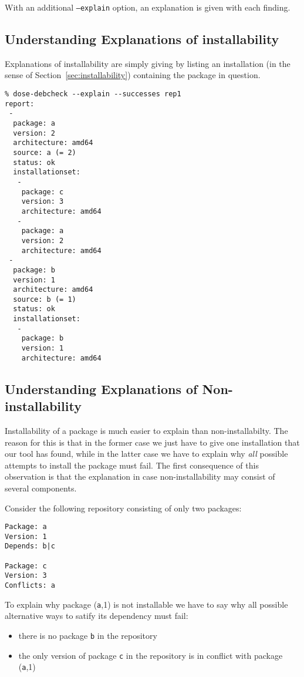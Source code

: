 With an additional \texttt{--explain} option, an explanation is given
with each finding. 

\subsection{Understanding Explanations of installability}

Explanations of installability are simply giving by listing an
installation (in the sense of Section~\ref{sec:installability})
containing the package in question.

\begin{example}
\begin{verbatim}
% dose-debcheck --explain --successes rep1
report:
 -
  package: a
  version: 2
  architecture: amd64
  source: a (= 2)
  status: ok
  installationset:
   -
    package: c
    version: 3
    architecture: amd64
   -
    package: a
    version: 2
    architecture: amd64
 -
  package: b
  version: 1
  architecture: amd64
  source: b (= 1)
  status: ok
  installationset:
   -
    package: b
    version: 1
    architecture: amd64
\end{verbatim}
\end{example}

\subsection{Understanding Explanations of Non-installability}

Installability of a package is much easier to explain than
non-installabilty. The reason for this is that in the former case we
just have to give one installation that our tool has found, while in
the latter case we have to explain why \emph{all} possible attempts to
install the package must fail. The first consequence of this
observation is that the explanation in case non-installability may
consist of several components.

\begin{example}
  Consider the following repository consisting of only two packages:
\begin{verbatim}
Package: a
Version: 1
Depends: b|c

Package: c
Version: 3
Conflicts: a
\end{verbatim}
To explain why package (\texttt{a},1) is not installable we have to
say why all possible alternative ways to satify its dependency must
fail:
\begin{itemize}
\item there is no package \texttt{b} in the repository
\item the only version of package \texttt{c} in the repository is in
  conflict with package (\texttt{a},1)
\end{itemize}
\end{example}

